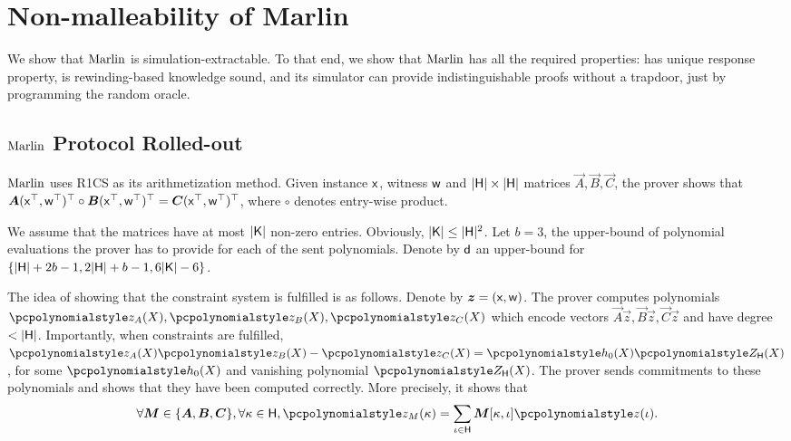 
\section{Non-malleability of Marlin}
We show that ${\textnormal{{Marlin}}}$ is simulation-extractable. To that end, we show
that ${\textnormal{{Marlin}}}$ has all the required properties: has unique response property, is
rewinding-based knowledge sound, and its simulator can provide indistinguishable proofs
without a trapdoor, just by programming the random oracle.

\subsection{${\textnormal{{Marlin}}}$ Protocol Rolled-out}
${\textnormal{{Marlin}}}$ uses R1CS as its arithmetization method. Given
instance $\mathsf{x}$, witness $\mathsf{w}$ and $|\mathsf{H}| \times |\mathsf{H}|$ matrices $\vec{A},
\vec{B}, \vec{C}$, the prover shows that $\vec{A} (\inp^\top, \wit^\top)^\top \circ \vec{B}
(\inp^\top, \wit^\top)^\top = \vec{C} (\inp^\top, \wit^\top)^\top$, where
$\circ$ denotes entry-wise product.

We assume that the matrices have at most $|\mathsf{K}|$ non-zero entries. Obviously,
$|\mathsf{K}| \leq |\mathsf{H}|^2$. Let $b = 3$, the upper-bound of polynomial evaluations
the prover has to provide for each of the sent polynomials.  Denote by $\mathsf{d}$
an upper-bound for $\{|\mathsf{H}| + 2b -1, 2 |\mathsf{H}| + b - 1, 6 |\mathsf{K}| - 6\}$.

The idea of showing that the constraint system is fulfilled is as
follows. Denote by $\vec{z} = (\inp, \wit)$. The prover computes polynomials
$\p{z_A} (X), \p{z_B} (X), \p{z_C} (X)$ which encode vectors
$\vec{A} \vec{z}, \vec{B} \vec{z}, \vec{C} \vec{z}$ and have degree $<
|\mathsf{H}|$. Importantly, when constraints are fulfilled,
$ \p{z_A} (X) \p{z_B} (X) - \p{z_C} (X) = \p{h_0} (X) \ZERO_\HHH (X)$, for some
$\p{h_0} (X)$ and vanishing polynomial $\ZERO_\HHH (X)$. The prover sends
commitments to these polynomials and shows that they have been computed
correctly. More precisely, it shows that
\begin{equation}
  \label{eq:marlin_eq_2}
\forall \vec{M} \in \smallset{\vec{A}, \vec{B}, \vec{C}},  \forall \kappa \in \HHH,
\p{z_M} (\kappa) = \sum_{\iota \in \HHH} \vec{M}[\kappa, \iota] \p{z}(\iota).
\end{equation}

